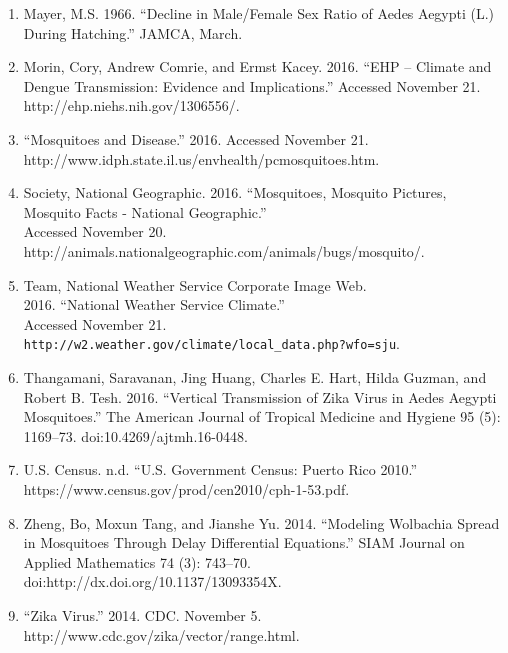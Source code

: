 \documentclass{article}
\begin{document}
\begin{enumerate}
    \item Mayer, M.S. 1966. “Decline in Male/Female Sex Ratio of Aedes Aegypti (L.) During Hatching.” JAMCA, March.
    
    \item Morin, Cory, Andrew Comrie, and Ermst Kacey. 2016. “EHP – Climate and Dengue Transmission: Evidence and Implications.” Accessed November 21. http://ehp.niehs.nih.gov/1306556/.
    
    \item “Mosquitoes and Disease.” 2016. Accessed November 21.\\ http://www.idph.state.il.us/envhealth/pcmosquitoes.htm.
    
    \item Society, National Geographic. 2016. “Mosquitoes, Mosquito Pictures,\\ Mosquito Facts - National Geographic.” \\Accessed November 20. \\http://animals.nationalgeographic.com/animals/bugs/mosquito/.
    
    \item Team, National Weather Service Corporate Image Web. \\
    2016. “National Weather Service Climate.” \\Accessed November 21.\\ \verb!http://w2.weather.gov/climate/local_data.php?wfo=sju!.
    
    \item Thangamani, Saravanan, Jing Huang, Charles E. Hart, Hilda Guzman, and Robert B. Tesh. 2016. “Vertical Transmission of Zika Virus in Aedes Aegypti Mosquitoes.” The American Journal of Tropical Medicine and Hygiene 95 (5): 1169–73. doi:10.4269/ajtmh.16-0448.
    
    \item U.S. Census. n.d. “U.S. Government Census: Puerto Rico 2010.”\\ https://www.census.gov/prod/cen2010/cph-1-53.pdf.
    
    \item Zheng, Bo, Moxun Tang, and Jianshe Yu. 2014. “Modeling Wolbachia Spread in Mosquitoes Through Delay Differential Equations.” SIAM Journal on Applied Mathematics 74 (3): 743–70.\\ doi:http://dx.doi.org/10.1137/13093354X.
    
    \item “Zika Virus.” 2014. CDC. November 5.\\ http://www.cdc.gov/zika/vector/range.html. 
\end{enumerate}
    
\end{document}
